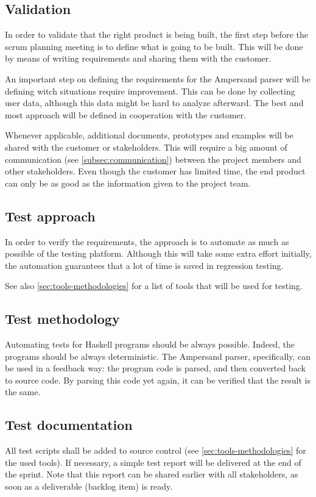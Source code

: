 \subsection{Validation}
In order to validate that the right product is being built, the first step before the scrum planning meeting is to define what is going to be built.
This will be done by means of writing requirements and sharing them with the customer.

An important step on defining the requirements for the Ampersand parser will be defining witch situations require improvement.
This can be done by collecting user data, although this data might be hard to analyze afterward.
The best and most approach will be defined in cooperation with the customer.

Whenever applicable, additional documents, prototypes and examples will be shared with the customer or stakeholders.
This will require a big amount of communication (see \autoref{subsec:communication}) between the project members and other stakeholders.
Even though the customer has limited time, the end product can only be as good as the information given to the project team.

\subsection{Test approach}
In order to verify the requirements, the approach is to automate as much as possible of the testing platform.
Although this will take some extra effort initially, the automation guarantees that a lot of time is saved in regression testing.

See also \autoref{sec:tools-methodologies} for a list of tools that will be used for testing.

\subsection{Test methodology}
Automating tests for Haskell programs should be always possible.
Indeed, the programs should be always deterministic.
The Ampersand parser, specifically, can be used in a feedback way: the program code is parsed, and then converted back to source code.
By parsing this code yet again, it can be verified that the result is the same.

\subsection{Test documentation}
All test scripts shall be added to source control (see \autoref{sec:tools-methodologies} for the used tools).
If necessary, a simple test report will be delivered at the end of the sprint.
Note that this report can be shared earlier with all stakeholders, as soon as a deliverable (backlog item) is ready.

